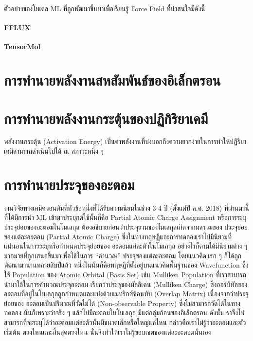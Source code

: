 ตัวอย่างของโมเดล ML ที่ถูกพัฒนาขึ้นมาเพื่อเรียนรู้ Force Field ที่น่าสนใจมีดังนี้

\paragraph{FFLUX}\autocite{hughes2019}

\paragraph{TensorMol}\autocite{yao2018}

\section{การทำนายพลังงานสหสัมพันธ์ของอิเล็กตรอน}
\label{sec:pred_corre_ener}

\autocite{mcdonagh2018,nudejima2019,dick2020,han2021}

\section{การทำนายพลังงานกระตุ้นของปฏิกิริยาเคมี}
\label{sec:pred_act_ener}

พลังงานกระตุ้น (Activation Energy) เป็นค่าพลังงานที่บ่งบอกถึงความยากง่ายในการทำให้ปฏิริยาเคมีสามารถดำเนินไปได้ ณ สภาวะหนึ่ง ๆ

\section{การทำนายประจุของอะตอม}
\label{sec:pred_atomic_charge}

งานวิจัยทางเคมีควอนตัมที่หัวข้อหนึ่งที่ได้รับความนิยมในช่วง 3-4 ปี (ตั้งแต่ปี ค.ศ. 2018) ที่ผ่านมานี้ที่ได้มีการนำ ML เข้ามาประยุกต์ใช้นั้นก็คือ 
Partial Atomic Charge Assignment หรือการระบุประจุย่อยของอะตอมในโมเลกุล ต้องอธิบายก่อนว่าประจุรวมของโมเลกุลเกิดจากผลรวมของ%
ประจุย่อยของแต่ละอะตอม (Partial Atomic Charge) ซึ่งในทางทฤษฎีและการทดลองเราไม่มีนิยามที่แน่นอนในการระบุหรือกำหนดประจุย่อยของ%
อะตอมแค่ละตัวในโมเลกุล อย่างไรก็ตามได้มีนิยามต่าง ๆ มากมายที่ถูกเสนอขึ้นมาเพื่อใช้ในการ \enquote{คำนวณ} ประจุของแต่ละอะตอม 
โดยแนวคิดแรก ๆ ก็ได้ถูกพัฒนามานานหลายสิบปีแล้ว หนึ่งในนั้นก็คือทฤษฎีที่ตั้งอยู่บนแนวคิดพื้นฐานของ Wavefunction ซึ่งใช้ Population 
ของ Atomic Orbital (Basis Set) เช่น Mulliken Population ที่เราสามารถนำมาใช้ในการคำนวณประจุอะตอม เรียกว่าประจุของมัลลิเคน 
(Mulliken Charge) ซึ่งออร์บิทัลของอะตอมที่อยู่ในโมเลกุลถูกกำหนดและแบ่งด้วยเมทริกซ์ซ้อนทับ (Overlap Matrix) เนื่องจากว่าประจุย่อยของ%
อะตอมเป็นปริมาณที่วัดไม่ได้ (Non-observable Property) ซึ่งไม่สามารถวัดได้ในทางทดลอง นั่นก็เพราะว่าจริง ๆ แล้วไม่มีอะตอมในโมเลกุล 
มีแต่กลุ่มก้อนของอิเล็กตรอน ดังนั้นเราจึงไม่สามารถที่จะระบุได้ว่าอะตอมแต่ละตัวนั้นมีขนาดเล็กหรือใหญ่แค่ไหน กล่าวคือเราไม่รู้ว่าอะตอมและตัวเริ่มต้น%
ตรงไหนและสิ้นสุดตรงไหน นั่นจึงทำให้เราไม่รู้ขอบเขตของแต่ละอะตอมนั่นเอง

